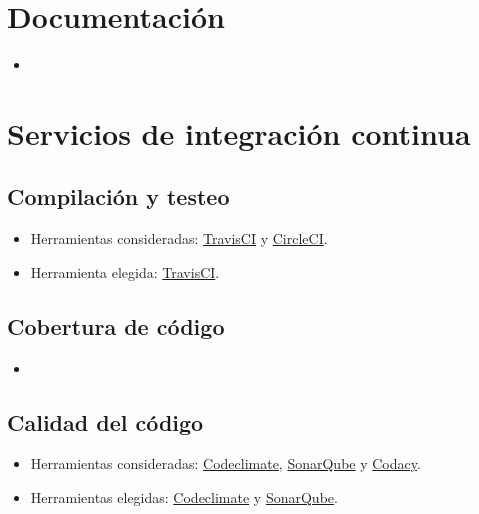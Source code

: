 \section{Documentación}\label{documentacion}

\begin{itemize}
	\tightlist
	\item
\end{itemize}


\section{Servicios de integración
	continua}\label{servicios-de-integraciuxf3n-continua}

\subsection{Compilación y testeo}\label{compilacion-y-testeo}

\begin{itemize}
	\tightlist
	\item
	Herramientas consideradas: \href{https://travis-ci.org/}{TravisCI} y
	\href{https://circleci.com/}{CircleCI}.
	\item
	Herramienta elegida: \href{https://travis-ci.org/}{TravisCI}.
\end{itemize}



\subsection{Cobertura de código}\label{cobertura-de-codigo}

\begin{itemize}
	\tightlist
	\item
\end{itemize}



\subsection{Calidad del código}\label{calidad-del-codigo}

\begin{itemize}
	\tightlist
	\item
	Herramientas consideradas:
	\href{https://codeclimate.com/}{Codeclimate},
	\href{https://sonarqube.com/}{SonarQube} y
	\href{https://www.codacy.com/}{Codacy}.
	\item
	Herramientas elegidas: \href{https://codeclimate.com/}{Codeclimate} y
	\href{https://sonarqube.com/}{SonarQube}.
\end{itemize}




